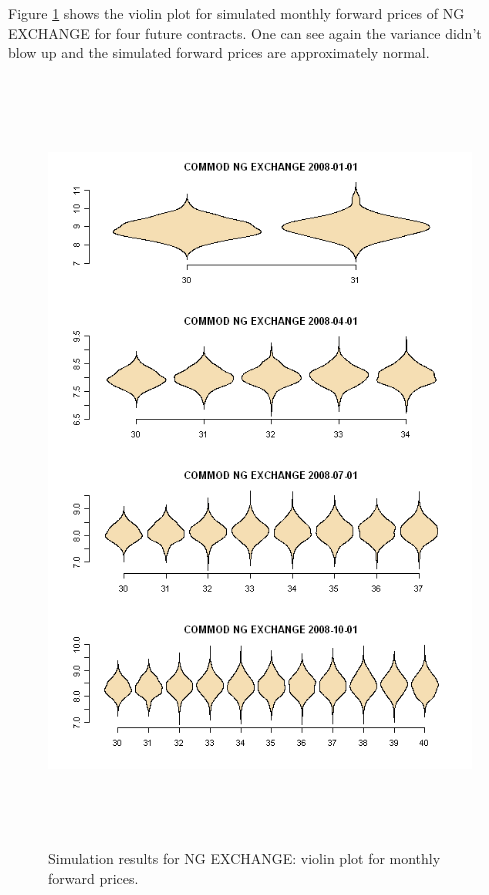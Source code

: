 Figure \ref{ng-violin} shows the violin plot for simulated 
monthly forward prices of NG EXCHANGE for four future contracts. 
One can see again the variance
didn't blow up and the simulated forward prices are approximately normal.
\begin{figure}[htbp]
\centering
\includegraphics[width=5.5in, height=8in]{figures/ng-exchange-violin.png}
\caption{Simulation results for NG EXCHANGE: violin plot 
for monthly forward prices.}
\label{ng-violin}
\end{figure}

